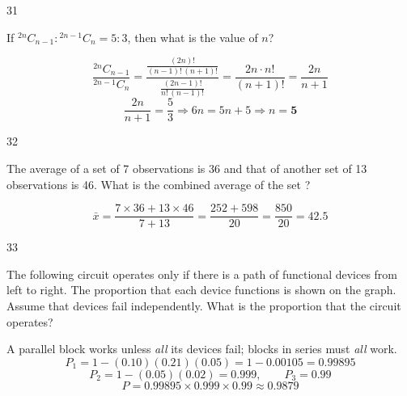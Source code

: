 \begin{question}{31}
{If ${}^{2n}C_{n-1} : {}^{2n-1}C_{n} = 5:3$, then what is the value of $n$?\par}
\begin{explain}
\[\frac{{}^{2n}C_{n-1}}{{}^{2n-1}C_n}=\frac{\frac{(2n)!}{(n-1)!\,(n+1)!}}{\frac{(2n-1)!}{n!\,(n-1)!}}=\frac{2n\cdot n!}{(n+1)!}=\frac{2n}{n+1}\]
\[\frac{2n}{n+1}=\frac53\Rightarrow6n=5n+5\Rightarrow n=\mathbf{5}\]
\end{explain}
\end{question}

\begin{question}{32}
{The average of a set of 7 observations is 36 and that of another set of 13 observations is 46. What is the combined average of the set ?\par}
\begin{explain}
\[\bar x=\frac{7\times36+13\times46}{7+13}=\frac{252+598}{20}=\frac{850}{20}=\mathbf{42.5}\]
\end{explain}
\end{question}

\begin{question}{33}
{The following circuit operates only if there is a path of functional devices from left to right. The proportion that each device functions is shown on the graph. Assume that devices fail independently. What is the proportion that the circuit operates?\par}
\begin{explain}
A parallel block works unless \emph{all} its devices fail; blocks in series must \emph{all} work.
\[P_1=1-(0.10)(0.21)(0.05)=1-0.00105=0.99895\]
\[P_2=1-(0.05)(0.02)=0.999,\qquad P_3=0.99\]
\[P=0.99895\times0.999\times0.99\approx\mathbf{0.9879}\]
\end{explain}
\end{question}

